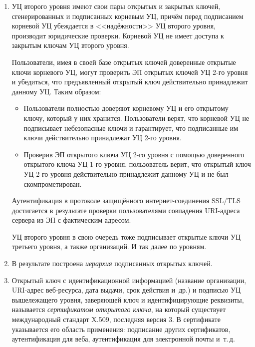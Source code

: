 \begin{enumerate}
    \item УЦ второго уровня имеют свои пары открытых и закрытых ключей, сгенерированных и подписанных корневым УЦ, причём перед подписанием корневой УЦ убеждается в <<надёжности>> УЦ второго уровня, производит юридические проверки. Корневой УЦ не имеет доступа к закрытым ключам УЦ второго уровня.

        Пользователи, имея в своей базе открытых ключей доверенные открытые ключи корневого УЦ, могут проверить ЭП открытых ключей УЦ 2-го уровня и убедиться, что предъявленный открытый ключ действительно принадлежит данному УЦ. Таким образом:
        \begin{itemize}
            \item Пользователи полностью доверяют корневому УЦ и его открытому ключу, который у них хранится. Пользователи верят, что корневой УЦ не подписывает небезопасные ключи и гарантирует, что подписанные им ключи действительно принадлежат УЦ 2-го уровня.
            \item Проверив ЭП открытого ключа УЦ 2-го уровня с помощью доверенного открытого ключа УЦ 1-го уровня, пользователь верит, что открытый ключ УЦ 2-го уровня действительно принадлежит данному УЦ и не был скомпрометирован.
        \end{itemize}

        Аутентификация в протоколе защищённого ин\-тер\-нет-сое\-ди\-не\-ния SSL/TLS достигается в результате проверки пользователями совпадения URI-адреса сервера из ЭП с фактическим адресом.

        УЦ второго уровня в свою очередь тоже подписывает открытые ключи УЦ третьего уровня, а также организаций. И так далее по уровням.

    \item В результате построена \emph{иерархия} подписанных открытых ключей.

    \item Открытый ключ с идентификационной информацией (название организации, URI-адрес веб-ресурса, дата выдачи, срок действия и~др.) и подписью УЦ вышележащего уровня, заверяющей ключ и идентифицирующие реквизиты, называется \emph{сертификатом открытого ключа}, на который существует международный стандарт X.509, последняя версия 3. В сертификате указывается его область применения: подписание других сертификатов, аутентификация для веба, аутентификация для электронной почты и~т.\,д.
\end{enumerate}

